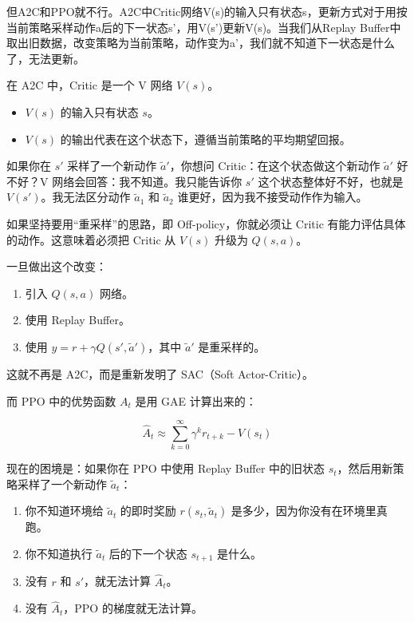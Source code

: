 但A2C和PPO就不行。A2C中Critic网络V(s)的输入只有状态s，更新方式对于用按当前策略采样动作a后的下一状态s'，用V(s')更新V(s)。当我们从Replay Buffer中取出旧数据，改变策略为当前策略，动作变为a'，我们就不知道下一状态是什么了，无法更新。

在 A2C 中，Critic 是一个 V 网络 \(V(s)\)。

\begin{itemize}
\tightlist
\item
  \(V(s)\) 的输入只有状态 \(s\)。
\item
  \(V(s)\) 的输出代表在这个状态下，遵循当前策略的平均期望回报。
\end{itemize}

如果你在 \(s'\) 采样了一个新动作 \(\tilde{a}'\)，你想问 Critic：在这个状态做这个新动作 \(\tilde{a}'\) 好不好？V 网络会回答：我不知道。我只能告诉你 \(s'\) 这个状态整体好不好，也就是 \(V(s')\)。我无法区分动作 \(\tilde{a}_1\) 和 \(\tilde{a}_2\) 谁更好，因为我不接受动作作为输入。

如果坚持要用``重采样''的思路，即 Off-policy，你就必须让 Critic 有能力评估具体的动作。这意味着必须把 Critic 从 \(V(s)\) 升级为 \(Q(s,a)\)。

一旦做出这个改变：

\begin{enumerate}
\def\labelenumi{\arabic{enumi}.}
\tightlist
\item
  引入 \(Q(s,a)\) 网络。
\item
  使用 Replay Buffer。
\item
  使用 \(y=r+\gamma Q(s',\tilde{a}')\)，其中 \(\tilde{a}'\) 是重采样的。
\end{enumerate}

这就不再是 A2C，而是重新发明了 SAC（Soft Actor-Critic）。

而 PPO 中的优势函数 \(A_t\) 是用 GAE 计算出来的：

\[
\hat{A}_t
\approx
\sum_{k=0}^{\infty}
\gamma^{k} r_{t+k}
-
V(s_t)
\]

现在的困境是：如果你在 PPO 中使用 Replay Buffer 中的旧状态 \(s_t\)，然后用新策略采样了一个新动作 \(\tilde{a}_t\)：

\begin{enumerate}
\def\labelenumi{\arabic{enumi}.}
\tightlist
\item
  你不知道环境给 \(\tilde{a}_t\) 的即时奖励 \(r(s_t,\tilde{a}_t)\) 是多少，因为你没有在环境里真跑。
\item
  你不知道执行 \(\tilde{a}_t\) 后的下一个状态 \(s_{t+1}\) 是什么。
\item
  没有 \(r\) 和 \(s'\)，就无法计算 \(\hat{A}_t\)。
\item
  没有 \(\hat{A}_t\)，PPO 的梯度就无法计算。
\end{enumerate}

